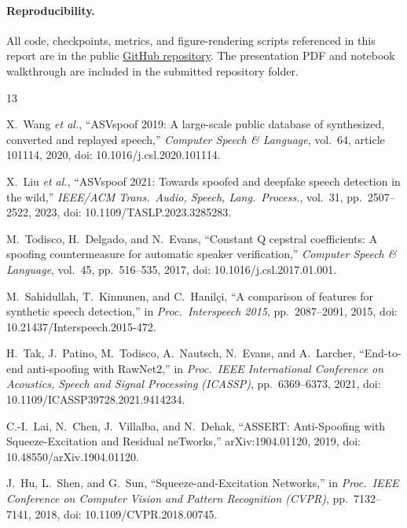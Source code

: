 \documentclass[11pt, letterpaper]{article}
\begin{document}
\paragraph{Reproducibility.}
All code, checkpoints, metrics, and figure-rendering scripts referenced in this report are in the public \href{https://github.com/brianstever/APCV485_Final_Project_Stever}{GitHub repository}. The presentation PDF and notebook walkthrough are included in the submitted repository folder.


\begin{thebibliography}{13}

X.~Wang \emph{et al.}, ``ASVspoof 2019: A large-scale public database of synthesized, converted and replayed speech,'' \emph{Computer Speech \& Language}, vol.~64, article 101114, 2020, doi: 10.1016/j.csl.2020.101114.

X.~Liu \emph{et al.}, ``ASVspoof 2021: Towards spoofed and deepfake speech detection in the wild,'' \emph{IEEE/ACM Trans.\ Audio, Speech, Lang.\ Process.}, vol.~31, pp.~2507--2522, 2023, doi: 10.1109/TASLP.2023.3285283.

M.~Todisco, H.~Delgado, and N.~Evans, ``Constant Q cepstral coefficients: A spoofing countermeasure for automatic speaker verification,'' \emph{Computer Speech \& Language}, vol.~45, pp.~516--535, 2017, doi: 10.1016/j.csl.2017.01.001.

M.~Sahidullah, T.~Kinnunen, and C.~Hanil\c{c}i, ``A comparison of features for synthetic speech detection,'' in \emph{Proc.\ Interspeech 2015}, pp.~2087--2091, 2015, doi: 10.21437/Interspeech.2015-472.

H.~Tak, J.~Patino, M.~Todisco, A.~Nautsch, N.~Evans, and A.~Larcher, ``End-to-end anti-spoofing with RawNet2,'' in \emph{Proc.\ IEEE International Conference on Acoustics, Speech and Signal Processing (ICASSP)}, pp.~6369--6373, 2021, doi: 10.1109/ICASSP39728.2021.9414234.

C.-I.~Lai, N.~Chen, J.~Villalba, and N.~Dehak, ``ASSERT: Anti-Spoofing with Squeeze-Excitation and Residual neTworks,'' arXiv:1904.01120, 2019, doi: 10.48550/arXiv.1904.01120.

J.~Hu, L.~Shen, and G.~Sun, ``Squeeze-and-Excitation Networks,'' in \emph{Proc.\ IEEE Conference on Computer Vision and Pattern Recognition (CVPR)}, pp.~7132--7141, 2018, doi: 10.1109/CVPR.2018.00745.


\end{thebibliography}
\end{document}
